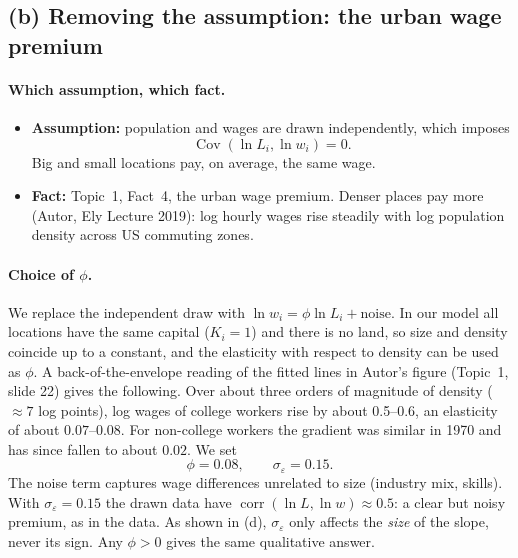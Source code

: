 \documentclass[11pt,a4paper]{article}
\begin{document}
\subsection*{(b) Removing the assumption: the urban wage premium}

\paragraph{Which assumption, which fact.}
\begin{itemize}[leftmargin=1.5em]
    \item \textbf{Assumption:} population and wages are drawn independently, which imposes
    \[
        \operatorname{Cov}(\ln L_i, \ln w_i) = 0 .
    \]
    Big and small locations pay, on average, the same wage.
    \item \textbf{Fact:} Topic~1, Fact~4, the urban wage premium. Denser places pay more (Autor, Ely Lecture 2019): log hourly wages rise steadily with log population density across US commuting zones.
\end{itemize}

\paragraph{Choice of $\phi$.}
We replace the independent draw with $\ln w_i = \phi \ln L_i + \text{noise}$. In our model all locations have the same capital ($K_i = 1$) and there is no land, so size and density coincide up to a constant, and the elasticity with respect to density can be used as $\phi$. A back-of-the-envelope reading of the fitted lines in Autor's figure (Topic~1, slide 22) gives the following. Over about three orders of magnitude of density ($\approx 7$ log points), log wages of college workers rise by about 0.5--0.6, an elasticity of about $0.07$--$0.08$. For non-college workers the gradient was similar in 1970 and has since fallen to about $0.02$. We set
\[
    \phi = 0.08, \qquad \sigma_\varepsilon = 0.15 .
\]
The noise term captures wage differences unrelated to size (industry mix, skills). With $\sigma_\varepsilon = 0.15$ the drawn data have $\operatorname{corr}(\ln L, \ln w) \approx 0.5$: a clear but noisy premium, as in the data. As shown in (d), $\sigma_\varepsilon$ only affects the \emph{size} of the slope, never its sign. Any $\phi > 0$ gives the same qualitative answer.
\end{document}
